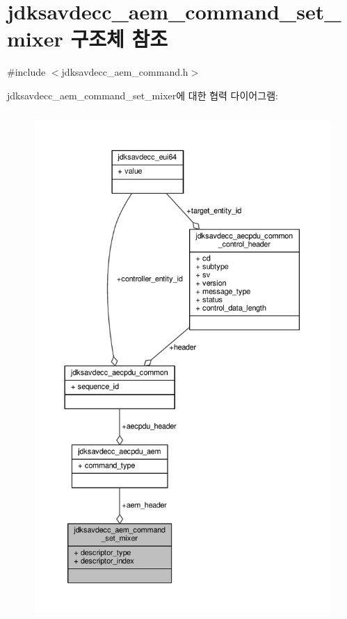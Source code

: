 \hypertarget{structjdksavdecc__aem__command__set__mixer}{}\section{jdksavdecc\+\_\+aem\+\_\+command\+\_\+set\+\_\+mixer 구조체 참조}
\label{structjdksavdecc__aem__command__set__mixer}


{\ttfamily \#include $<$jdksavdecc\+\_\+aem\+\_\+command.\+h$>$}



jdksavdecc\+\_\+aem\+\_\+command\+\_\+set\+\_\+mixer에 대한 협력 다이어그램\+:
\nopagebreak
\begin{figure}[H]
\begin{center}
\leavevmode
\includegraphics[height=550pt]{structjdksavdecc__aem__command__set__mixer__coll__graph}
\end{center}
\end{figure}

